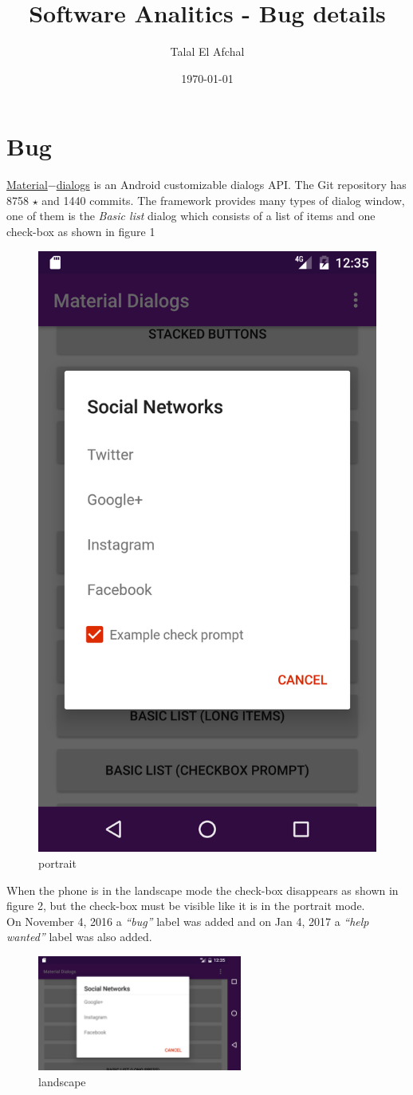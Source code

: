 \documentclass[12pt]{report}
\begin{document}
\title{Software Analitics - Bug details}
\author{Talal El Afchal}
\date{\today}
\maketitle
	\section*{Bug}
\href{https://github.com/afollestad/material-dialogs}{Material$-$dialogs} is an Android customizable dialogs API. The Git repository has 8758 $\star$ and 1440 commits.
The framework provides many types of dialog window, one of them is the \emph{Basic list} dialog which consists of a list of items and one check-box as shown in figure 1

\begin{figure}[H]
	\centering
	\includegraphics[height=0.4\textwidth]{screenshots/portrait.png}
	\caption{portrait}
\end{figure}
\noindent When the phone is in the landscape mode the check-box disappears as shown in figure 2, but the check-box must be visible like it is in the portrait mode.\\ On November 4, 2016 a \emph{``bug''} label was added and on Jan 4, 2017 a \emph{``help wanted''} label was also added.\\


\begin{figure}[H]
	\centering
	\includegraphics[width=0.6\textwidth]{screenshots/landscape.png}
	\caption{landscape}
\end{figure}
\end{document}
